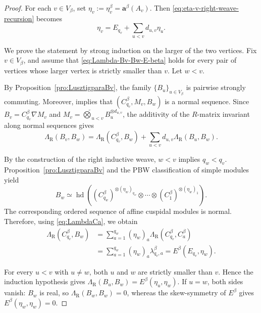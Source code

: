 \documentclass[12pt, reqno]{amsart}
\theoremstyle{plain}
\theoremstyle{definition}
\numberwithin{equation}{section}
\newcommand{\LambdaR}{\Lambda_{\mathrm R}}
\begin{document}
\begin{proof}
For each \(v\in V_\beta\), set
\(\eta_v:=\eta_v^\beta=\mathbf a^\beta(A_v)\). Then
\eqref{eq:eta-v-right-weave-recursion} becomes
\begin{equation}\label{eq:eta-B-recursion}
    \eta_v
    =
    E_{q_v}
    +
    \sum_{u<v}d_{u,v}\eta_u.
\end{equation}

We prove the statement by strong induction on the larger of the two
vertices. Fix \(v\in V_\beta\), and assume that
\eqref{eq:Lambda-Bv-Bw-E-beta} holds for every pair of vertices whose
larger vertex is strictly smaller than \(v\). Let \(w<v\).

By Proposition~\ref{pro:LusztigparaBv}, the family
\(\{B_u\}_{u\in V_\beta}\) is pairwise strongly commuting. Moreover,
\cite[Lemma~2.24]{kashiwara2023pbw} implies that
\((C_{q_v}^\beta,M_v,B_w)\) is a normal sequence. Since
\(B_v=C_{q_v}^\beta\nabla M_v\) and
\(M_v=\overleftarrow{\bigotimes}_{u<v}
B_u^{\otimes d_{u,v}}\), the additivity of the \(R\)-matrix invariant
along normal sequences gives
\begin{equation}\label{eq:Lambda-recursion}
    \LambdaR(B_v,B_w)
    =
    \LambdaR(C_{q_v}^\beta,B_w)
    +
    \sum_{u<v}d_{u,v}\LambdaR(B_u,B_w).
\end{equation}

By the construction of the right inductive weave, \(w<v\) implies
\(q_w<q_v\). Proposition~\ref{pro:LusztigparaBv} and the PBW
classification of simple modules yield
\begin{equation}\label{eq:PBW-realization-Bw}
    B_w
    \simeq
    \operatorname{hd}\left(
        (C_{q_w}^\beta)^{\otimes(\eta_w)_{q_w}}
        \otimes\cdots\otimes
        (C_1^\beta)^{\otimes(\eta_w)_1}
    \right).
\end{equation}
The corresponding ordered sequence of affine cuspidal modules is
normal. Therefore, using \eqref{eq:LambdaCa}, we obtain
\begin{align}
    \LambdaR(C_{q_v}^\beta,B_w)
    &=
    \sum_{a=1}^{q_w}
    (\eta_w)_a
    \LambdaR(C_{q_v}^\beta,C_a^\beta)
    \nonumber\\
    &=
    \sum_{a=1}^{q_w}
    (\eta_w)_a\lambda_{q_v,a}^\beta
    =
    E^\beta(E_{q_v},\eta_w).
    \label{eq:Lambda-root-B}
\end{align}

For every \(u<v\) with \(u\neq w\), both \(u\) and \(w\) are strictly
smaller than \(v\). Hence the induction hypothesis gives
\(\LambdaR(B_u,B_w)=E^\beta(\eta_u,\eta_w)\). If \(u=w\), both sides
vanish: \(B_w\) is real, so \(\LambdaR(B_w,B_w)=0\), whereas the
skew-symmetry of \(E^\beta\) gives
\(E^\beta(\eta_w,\eta_w)=0\).


\end{proof}
\end{document}
